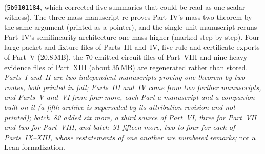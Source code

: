 \documentclass[11pt]{article}
\begin{document}
{(\texttt{5b9101184}, which corrected five summaries that could be read as
one scalar witness).
The three-mass manuscript re-proves Part~IV's mass-two theorem by the same
argument (printed as a pointer), and the single-unit manuscript reruns
Part~IV's semilinearity architecture one mass higher (marked step by step).  Four large packet and fixture files of Parts~III
and~IV, five rule and certificate exports of Part~V (20.8\,MB), the 70
emitted circuit files of Part~VIII and nine heavy evidence files of
Part~XIII (about 35\,MB) are regenerated rather than stored.
\emph{Parts~I and~II are two independent manuscripts proving one theorem by
two routes, both printed in full; Parts~III and~IV come from two further
manuscripts, and Parts~V and~VI from four more, each Part a manuscript and
a companion built on it (a fifth archive is superseded by its attribution
revision and not printed); batch~82 added six more, a third source of
Part~VI, three for Part~VII and two for Part~VIII, and batch~91 fifteen
more, two to four for each of Parts~IX--XIII, whose restatements of one
another are numbered remarks;}
not a Lean formalization.}
\end{document}
